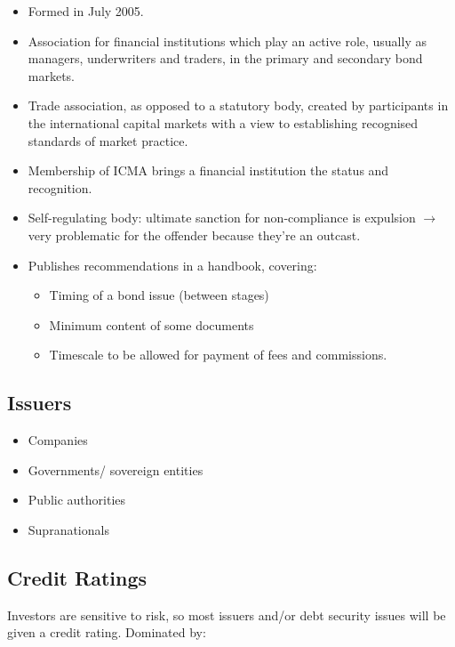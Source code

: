 \documentclass[
]{article}
\providecommand{\tightlist}{%
  \setlength{\itemsep}{0pt}\setlength{\parskip}{0pt}}
\begin{document}
\begin{itemize}
\tightlist
\item
  Formed in July 2005.
\item
  Association for financial institutions which play an active role,
  usually as managers, underwriters and traders, in the primary and
  secondary bond markets.
\item
  Trade association, as opposed to a statutory body, created by
  participants in the international capital markets with a view to
  establishing recognised standards of market practice.
\item
  Membership of ICMA brings a financial institution the status and
  recognition.
\item
  Self-regulating body: ultimate sanction for non-compliance is
  expulsion \(\rightarrow\) very problematic for the offender because
  they're an outcast.
\item
  Publishes recommendations in a handbook, covering:

  \begin{itemize}
  \tightlist
  \item
    Timing of a bond issue (between stages)
  \item
    Minimum content of some documents
  \item
    Timescale to be allowed for payment of fees and commissions.
  \end{itemize}
\end{itemize}

\hypertarget{issuers}{%
\subsection{Issuers}\label{issuers}}

\begin{itemize}
\tightlist
\item
  Companies
\item
  Governments/ sovereign entities
\item
  Public authorities
\item
  Supranationals
\end{itemize}

\hypertarget{credit-ratings}{%
\subsection{Credit Ratings}\label{credit-ratings}}

Investors are sensitive to risk, so most issuers and/or debt security
issues will be given a credit rating. Dominated by:
\end{document}
